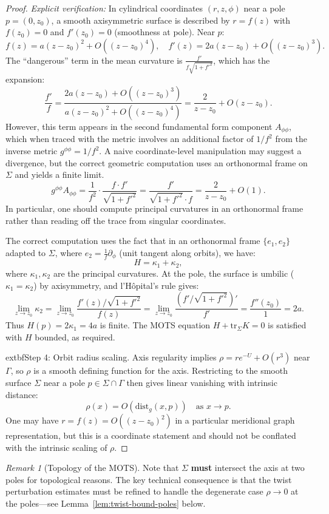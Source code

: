 \documentclass[12pt]{article}
\theoremstyle{plain}
\theoremstyle{definition}
\theoremstyle{remark}
\newtheorem{remark}[theorem]{Remark}
\newcommand{\tr}{\mathrm{tr}}
\begin{document}
\begin{proof}
\textit{Explicit verification:} In cylindrical coordinates $(r, z, \phi)$ near a pole $p = (0, z_0)$, a smooth axisymmetric surface is described by $r = f(z)$ with $f(z_0) = 0$ and $f'(z_0) = 0$ (smoothness at pole). Near $p$:
\[
f(z) = a(z - z_0)^2 + O((z-z_0)^4), \quad f'(z) = 2a(z-z_0) + O((z-z_0)^3).
\]
The ``dangerous'' term in the mean curvature is $\frac{f'}{f \sqrt{1+f'^2}}$, which has the expansion:
\[
\frac{f'}{f} = \frac{2a(z-z_0) + O((z-z_0)^3)}{a(z-z_0)^2 + O((z-z_0)^4)} = \frac{2}{z-z_0} + O(z-z_0).
\]
However, this term appears in the second fundamental form component $A_{\phi\phi}$, which when traced with the metric involves an additional factor of $1/f^2$ from the inverse metric $g^{\phi\phi} = 1/f^2$. A naive coordinate-level manipulation may suggest a divergence, but the correct geometric computation uses an orthonormal frame on $\Sigma$ and yields a finite limit.
\[
g^{\phi\phi} A_{\phi\phi} = \frac{1}{f^2} \cdot \frac{f \cdot f'}{\sqrt{1+f'^2}} = \frac{f'}{\sqrt{1+f'^2} \cdot f} = \frac{2}{z-z_0} + O(1).
\]
In particular, one should compute principal curvatures in an orthonormal frame rather than reading off the trace from singular coordinates.

The correct computation uses the fact that in an orthonormal frame $\{e_1, e_2\}$ adapted to $\Sigma$, where $e_2 = \frac{1}{f}\partial_\phi$ (unit tangent along orbits), we have:
\[
H = \kappa_1 + \kappa_2,
\]
where $\kappa_1, \kappa_2$ are the principal curvatures. At the pole, the surface is umbilic ($\kappa_1 = \kappa_2$) by axisymmetry, and l'H\^opital's rule gives:
\[
\lim_{z \to z_0} \kappa_2 = \lim_{z \to z_0} \frac{f'(z)/\sqrt{1+f'^2}}{f(z)} = \lim_{z \to z_0} \frac{(f'/\sqrt{1+f'^2})'}{f'} = \frac{f''(z_0)}{1} = 2a.
\]
Thus $H(p) = 2\kappa_1 = 4a$ is finite. The MOTS equation $H + \tr_\Sigma K = 0$ is satisfied with $H$ bounded, as required.

	extbf{Step 4: Orbit radius scaling.}
Axis regularity implies $\rho = r e^{-U} + O(r^3)$ near $\Gamma$, so $\rho$ is a smooth defining function for the axis. Restricting to the smooth surface $\Sigma$ near a pole $p\in\Sigma\cap\Gamma$ then gives linear vanishing with intrinsic distance:
\[
\rho(x) = O(\mathrm{dist}_g(x,p))\quad \text{as } x\to p.
\]
One may have $r=f(z)=O((z-z_0)^2)$ in a particular meridional graph representation, but this is a coordinate statement and should not be conflated with the intrinsic scaling of $\rho$.
\end{proof}

\begin{remark}[Topology of the MOTS]\label{rem:axis-correction}
Note that $\Sigma$ \textbf{must} intersect the axis at two poles for topological reasons. The key technical consequence is that the twist perturbation estimates must be refined to handle the degenerate case $\rho \to 0$ at the poles---see Lemma~\ref{lem:twist-bound-poles} below.
\end{remark}
\end{document}
